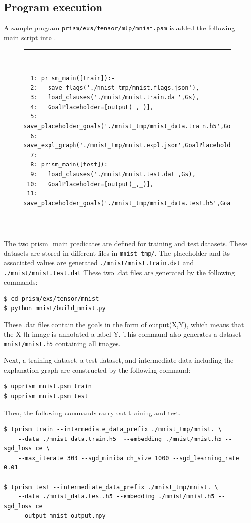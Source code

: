 \documentclass[a4paper]{report}
\begin{document}
\subsection*{Program execution}

A sample program {\tt prism/exs/tensor/mlp/mnist.psm} is added the following main script into .
\begin{figure}[h]
	\rule{0.85\textwidth}{0.10mm}\\ [-1em]
	\begin{verbatim}
  1: prism_main([train]):-
  2:   save_flags('./mnist_tmp/mnist.flags.json'),
  3:   load_clauses('./mnist/mnist.train.dat',Gs),
  4:   GoalPlaceholder=[output(_,_)],
  5:   save_placeholder_goals('./mnist_tmp/mnist_data.train.h5',GoalPlaceholder,Gs),
  6:   save_expl_graph('./mnist_tmp/mnist.expl.json',GoalPlaceholder).
  7: 
  8: prism_main([test]):-
  9:   load_clauses('./mnist/mnist.test.dat',Gs),
 10:   GoalPlaceholder=[output(_,_)],
 11:   save_placeholder_goals('./mnist_tmp/mnist_data.test.h5',GoalPlaceholder,Gs).
	\end{verbatim}
	\rule{0.85\textwidth}{0.10mm}\\ [-1em]
\end{figure}

The two {prism\_main} predicates are defined for training and test datasets.
These datasets are stored in different files in \verb|mnist_tmp/|.
The placeholder and its associated values are generated {\tt ./mnist/mnist.train.dat} and {\tt ./mnist/mnist.test.dat}
These two .dat files are generated by the following commands:
\begin{verbatim}
$ cd prism/exs/tensor/mnist
$ python mnist/build_mnist.py
\end{verbatim}
These .dat files contain the goals in the form of output(X,Y), which means that the X-th image is annotated a label Y.
This command also generates a dataset {\tt mnist/mnist.h5} containing all images.

Next, a training dataset, a test dataset, and intermediate data including the explanation graph are constructed by the following command: 
\begin{verbatim}
$ upprism mnist.psm train
$ upprism mnist.psm test
\end{verbatim}
 
Then, the following commands carry out training and test:
\begin{verbatim}
$ tprism train --intermediate_data_prefix ./mnist_tmp/mnist. \
    --data ./mnist_data.train.h5  --embedding ./mnist/mnist.h5 --sgd_loss ce \
    --max_iterate 300 --sgd_minibatch_size 1000 --sgd_learning_rate 0.01
  
$ tprism test --intermediate_data_prefix ./mnist_tmp/mnist. \
    --data ./mnist_data.test.h5 --embedding ./mnist/mnist.h5 --sgd_loss ce  
    --output mnist_output.npy
\end{verbatim}
\end{document}
